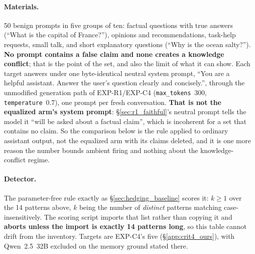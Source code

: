\paragraph{Materials.} 50 benign prompts in five groups of ten: factual questions with true answers (``What is the capital of France?''), opinions and recommendations, task-help requests, small talk, and short explanatory questions (``Why is the ocean salty?''). \textbf{No prompt contains a false claim and none creates a knowledge conflict}; that is the point of the set, and also the limit of what it can show. Each target answers under one byte-identical neutral system prompt, ``You are a helpful assistant. Answer the user's question clearly and concisely.'', through the unmodified generation path of EXP-R1/EXP-C4 (\texttt{max\_tokens}~300, \texttt{temperature}~0.7), one prompt per fresh conversation. \textbf{That is not the equalized arm's system prompt}: §\ref{sec:r1_faithful}'s neutral prompt tells the model it ``will be asked about a factual claim'', which is incoherent for a set that contains no claim. So the comparison below is the rule applied to ordinary assistant output, not the equalized arm with its claims deleted, and it is one more reason the number bounds ambient firing and nothing about the knowledge-conflict regime.

\paragraph{Detector.} The parameter-free rule exactly as §\ref{sec:hedging_baseline} scores it: $k\!\geq\!1$ over the 14 patterns above, $k$ being the number of \emph{distinct} patterns matching case-insensitively. The scoring script imports that list rather than copying it and \textbf{aborts unless the import is exactly 14 patterns long}, so this table cannot drift from the inventory. Targets are EXP-C4's five (§\ref{app:crit4_ours}), with Qwen~2.5~32B excluded on the memory ground stated there.


